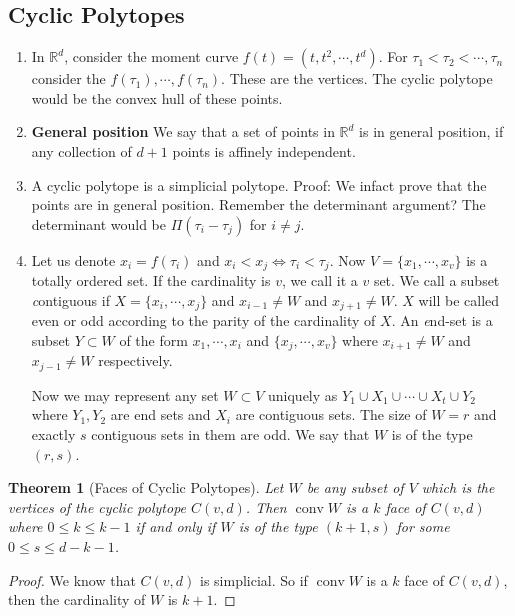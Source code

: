 \documentclass[a4paper,10pt,landscape]{article}
\newtheorem{theorem}{Theorem}[section]
\def\R{\mathbb{R}}
\def\conv{\operatorname{conv}}
\begin{document}
\begin{multicols}{3}
    \section{Cyclic Polytopes}
    \begin{enumerate}
    \item In $\R^d$, consider the moment curve $f(t) = (t, t^2, \cdots, t^{d})$.
      For $\tau_1 < \tau_2 < \cdots, \tau_n$ consider the $f(\tau_1), \cdots,
      f(\tau_n)$. These are the vertices. The cyclic polytope would be the
      convex hull of these points.
    \item {\bf General position} We say that a set of points in $\R^d$ is in
      general position, if any collection of $d+1$ points is affinely
      independent.
    \item A cyclic polytope is a simplicial polytope. Proof: We infact prove
      that the points are in general position. Remember the determinant
      argument? The determinant would be $\Pi(\tau_i - \tau_j)$ for $i \neq
      j$.
    \item Let us denote $x_i = f(\tau_i)$ and $x_i < x_j \iff \tau_i < \tau_j$.
      Now $V = \{x_1, \cdots, x_v\}$ is a totally ordered set. If the
      cardinality is $v$, we call it a $v$ set. We call a subset {\emph
        contiguous} if $X = \{x_i, \cdots, x_j\}$ and $x_{i-1} \neq W$ and
      $x_{j+1} \neq W$. $X$ will be called even or odd according to the parity
      of the cardinality of $X$. An {\emph end-set} is a subset $Y \subset W$ of
      the form ${x_1, \cdots, x_i}$ and $\{x_j, \cdots, x_v\}$ where $x_{i+1}
        \neq W$ and $x_{j-1} \neq W$ respectively.

        Now we may represent any set $W \subset V$ uniquely as $Y_1 \cup X_1
        \cup \cdots \cup X_t \cup Y_2$ where $Y_1, Y_2$ are end sets and $X_i$
        are contiguous sets. The size of $W = r$ and exactly $s$ contiguous sets
        in them are odd. We say that $W$ is of the type $(r, s)$.
    \end{enumerate}

    
    \begin{theorem}[Faces of Cyclic Polytopes]
      Let $W$ be any subset of $V$ which is the vertices of the cyclic polytope
      $C(v, d)$. Then $\conv W$ is a $k$ face of $C(v, d)$ where $0 \le k \le k
      - 1$ if and only if $W$ is of the type $(k + 1, s)$ for some $0 \le s\le d
      - k - 1$.
    \end{theorem}
    \begin{proof}
      We know that $C(v, d)$ is simplicial. So if $\conv W$ is a $k$ face of
      $C(v, d)$, then the cardinality of $W$ is $k + 1$.


\end{proof}
\end{multicols}
\end{document}

